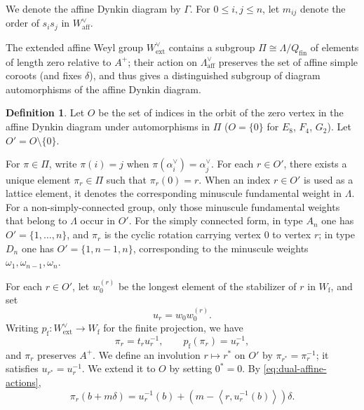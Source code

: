 \documentclass{amsart}
\theoremstyle{definition}
\newtheorem{defi}[Thm]{Definition}
\numberwithin{equation}{section}
\begin{document}
We denote the affine Dynkin diagram by $\Gamma$.
For \(0\leqslant i,j\leqslant n\), let \(m_{ij}\) denote the order of \(s_is_j\) in
\(W_{\mathrm{aff}}^\vee\).

The extended affine Weyl group \(W_{\mathrm{ext}}^\vee\) contains a subgroup
\(\Pi \cong \Lambda/Q_{\mathrm{fin}}\) of elements of length zero relative to \(A^+\); their action
on \(\Lambda_{\mathrm{aff}}^\vee\) preserves the set of affine simple coroots
(and fixes \(\delta\)), and thus gives a distinguished subgroup of diagram
automorphisms of the affine Dynkin diagram.

\begin{defi}
    Let $O$ be the set of indices in the orbit of the zero vertex in the affine Dynkin diagram under automorphisms in $\Pi$ ($O= \{0\}$ for $E_8$, $F_4$, $G_2$). Let $O' = O \setminus \{0\}$.
\end{defi}

For \(\pi\in\Pi\), write \(\pi(i)=j\) when
\(\pi(\alpha_i^\vee)=\alpha_j^\vee\). For each $r \in O'$, there exists a unique element $\pi_r \in \Pi$ such that $\pi_r(0)=r$. When an index $r\in O'$ is used as a lattice element, it denotes the corresponding minuscule fundamental weight in \(\Lambda\). For a non-simply-connected group, only those minuscule fundamental weights that belong to \(\Lambda\) occur in \(O'\). For the simply connected form, in type $A_n$ one has $O'=\{1,\ldots,n\}$, and $\pi_r$ is the cyclic rotation carrying vertex $0$ to vertex $r$; in type $D_n$ one has $O'=\{1,n-1,n\}$, corresponding to the minuscule weights $\omega_1,\omega_{n-1},\omega_n$.

For each \(r\in O'\), let \(w_0^{(r)}\) be the longest element of the
stabilizer of \(r\) in \(W_{\mathrm f}\), and set
\[
u_r=w_0w_0^{(r)}.
\]
Writing \(p_{\mathrm f}:W_{\mathrm{ext}}^\vee\to W_{\mathrm f}\) for the
finite projection, we have
\begin{equation}\label{eq:positive-length-zero}
\pi_r=t_ru_r^{-1},
\qquad
p_{\mathrm f}(\pi_r)=u_r^{-1},
\end{equation}
and \(\pi_r\) preserves \(A^+\). We define an involution
\(r\mapsto r^*\) on \(O'\) by \(\pi_{r^*}=\pi_r^{-1}\); it satisfies
\(u_{r^*}=u_r^{-1}\). We extend it to \(O\) by setting \(0^*=0\). By \eqref{eq:dual-affine-actions},
\begin{equation}\label{eq:pi-affine-action}
\pi_r(b+m\delta)
=u_r^{-1}(b)
+\left(m-\left\langle r,u_r^{-1}(b)\right\rangle\right)\delta.
\end{equation}
\end{document}
